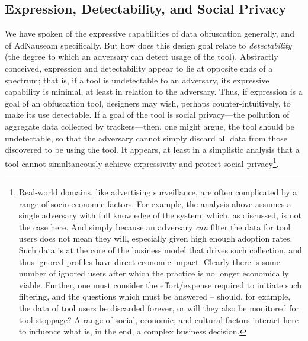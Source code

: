 \documentclass[conference]{IEEEtran}
\begin{document}

\subsection{Expression, Detectability, and Social Privacy}

We have spoken of the expressive capabilities of data obfuscation generally, and of AdNauseam specifically. But how does this design goal relate to \emph{detectability} (the degree to which an adversary can detect usage of the tool). Abstractly conceived, expression and detectability appear to lie at opposite ends of a spectrum; that is, if a tool is undetectable to an adversary, its expressive capability is minimal, at least in relation to the adversary. Thus, if expression is a goal of an obfuscation tool, designers may wish, perhaps counter-intuitively, to make its use detectable. If a goal of the tool is social privacy---the pollution of aggregate data collected by trackers---then, one might argue, the tool should be undetectable, so that the adversary cannot simply discard all data from those discovered to be using the tool. It appears, at least in a simplistic analysis that a tool cannot simultaneously achieve expressivity and protect social privacy\footnote{Real-world domains, like advertising surveillance, are often complicated by a range of socio-economic factors. For example, the analysis above assumes a single adversary with full knowledge of the system, which, as discussed, is not the case here. And simply because an adversary \emph{can} filter the data for tool users does not mean they will, especially given high enough adoption rates. Such data is at the core of the business model that drives such collection, and thus ignored profiles have direct economic impact. Clearly there is some number of ignored users after which the practice is no longer economically viable. Further, one must consider the effort/expense required to initiate such filtering, and the questions which must be answered -- should, for example, the data of tool users be discarded forever, or will they also be monitored for tool stoppage? A range of social, economic, and cultural factors interact here to influence what is, in the end, a complex business decision.}.
\end{document}
